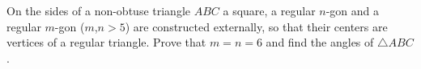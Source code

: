 On the sides of a non-obtuse triangle $ABC$ a square, a regular $n$-gon and a regular $m$-gon ($m$,$n > 5$) are constructed externally, so that their centers are vertices of a regular triangle. Prove that $m = n = 6$ and find the angles of $\triangle ABC$.